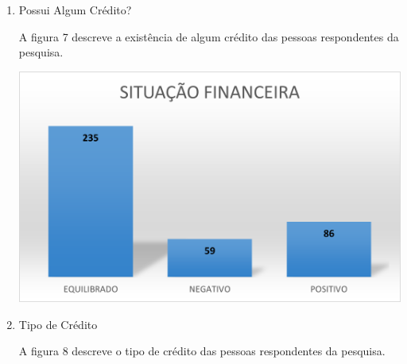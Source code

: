 \begin{enumerate}
    \vspace{\baselineskip}
    \vspace{\baselineskip}
    \vspace{\baselineskip}
    \vspace{\baselineskip}
    \vspace{\baselineskip}
    \vspace{\baselineskip}
    \item Possui Algum Crédito?

    A figura 7 descreve a existência de algum crédito das pessoas respondentes da pesquisa.

    \vspace{\baselineskip}
    \begin{center}
        \begin{minipage}{\textwidth}
            \includegraphics{figs/graph_situacao.png}
            \label{fig:graph_situacao}
        \end{minipage}        
    \end{center}


    \item Tipo de Crédito

    A figura 8 descreve o tipo de crédito das pessoas respondentes da pesquisa.


\end{enumerate}
